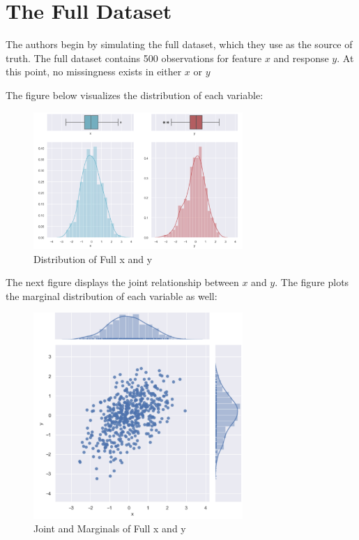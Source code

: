 \documentclass[12pt,oneside]{chicagocapstone}
\begin{document}
\section*{The Full Dataset}\label{the-full-dataset}

The authors begin by simulating the full dataset, which they use as the
source of truth. The full dataset contains 500 observations for feature
\(x\) and response \(y\). At this point, no missingness exists in either
\(x\) or \(y\)

The figure below visualizes the distribution of each variable:
\begin{figure}

{\centering \includegraphics[width=300px]{figure/full-side-by-side} 

}

\caption{Distribution of Full x and y}\label{fig:fullsidebyside}
\end{figure}
The next figure displays the joint relationship between \(x\) and \(y\).
The figure plots the marginal distribution of each variable as well:
\begin{figure}

{\centering \includegraphics[width=300px]{figure/full-joint} 

}

\caption{Joint and Marginals of Full x and y}\label{fig:full-joint}
\end{figure}
\end{document}
